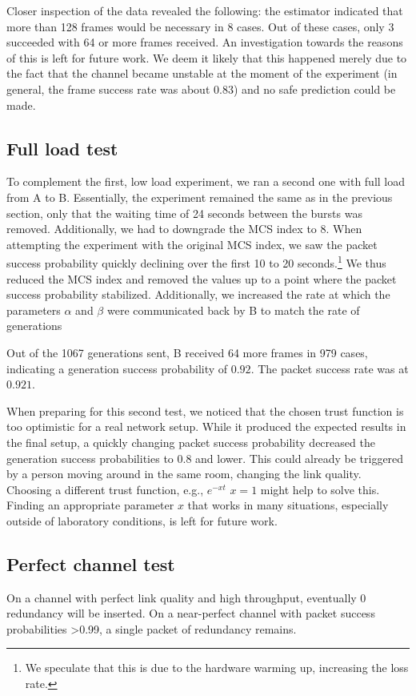 \documentclass[10pt,a4paper]{article}
\begin{document}
Closer inspection of the data revealed the following:
the estimator indicated that more than 128 frames would be necessary in 8 cases.
Out of these cases, only 3 succeeded with 64 or more frames received.
An investigation towards the reasons of this is left for future work.
We deem it likely that this happened merely due to the fact that the channel became unstable at the moment of the experiment (in general, the frame success rate was about $0.83$) and no safe prediction could be made.

\subsection{Full load test}
To complement the first, low load experiment, we ran a second one with full load from A to B.
Essentially, the experiment remained the same as in the previous section, only that the waiting time of 24 seconds between the bursts was removed.
Additionally, we had to downgrade the MCS index to 8.
When attempting the experiment with the original MCS index, we saw the packet success probability quickly declining over the first 10 to 20 seconds.\footnote{%
	We speculate that this is due to the hardware warming up, increasing the loss rate.}
We thus reduced the MCS index and removed the values up to a point where the packet success probability stabilized.
Additionally, we increased the rate at which the parameters $\alpha$ and $\beta$ were communicated back by B to match the rate of generations

Out of the 1067 generations sent, B received 64 more frames in 979 cases, indicating a generation success probability of $0.92$.
The packet success rate was at $0.921$.

When preparing for this second test, we noticed that the chosen trust function is too optimistic for a real network setup.
While it produced the expected results in the final setup, a quickly changing packet success probability decreased the generation success probabilities to $0.8$ and lower.
This could already be triggered by a person moving around in the same room, changing the link quality.
Choosing a different trust function, e.g., $e^{-xt}$ $x=1$ might help to solve this.
Finding an appropriate parameter $x$ that works in many situations, especially outside of laboratory conditions, is left for future work.

\subsection{Perfect channel test}
On a channel with perfect link quality and high throughput, eventually 0 redundancy will be inserted.
On a near-perfect channel with packet success probabilities >0.99, a single packet of redundancy remains.
\end{document}
